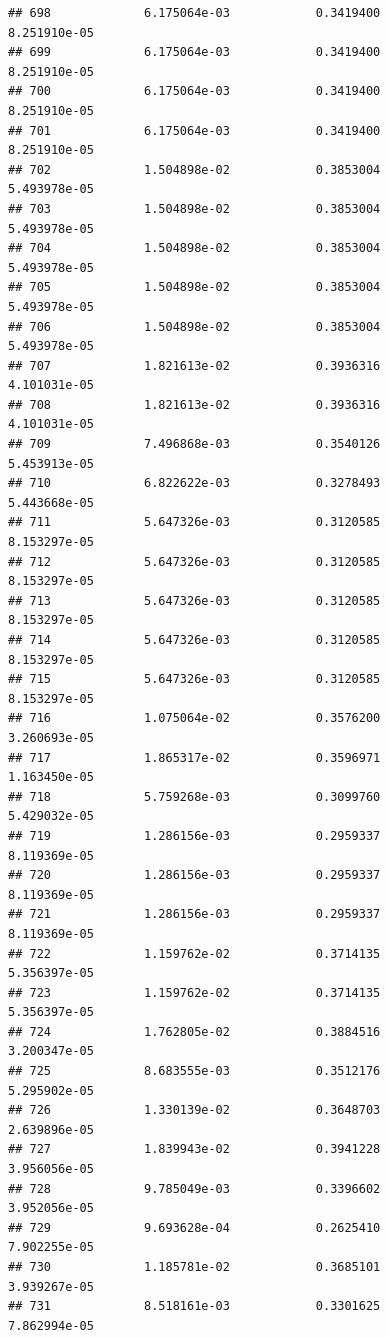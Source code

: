 \documentclass[
]{article}
\begin{document}
\begin{verbatim}
## 698             6.175064e-03            0.3419400            8.251910e-05
## 699             6.175064e-03            0.3419400            8.251910e-05
## 700             6.175064e-03            0.3419400            8.251910e-05
## 701             6.175064e-03            0.3419400            8.251910e-05
## 702             1.504898e-02            0.3853004            5.493978e-05
## 703             1.504898e-02            0.3853004            5.493978e-05
## 704             1.504898e-02            0.3853004            5.493978e-05
## 705             1.504898e-02            0.3853004            5.493978e-05
## 706             1.504898e-02            0.3853004            5.493978e-05
## 707             1.821613e-02            0.3936316            4.101031e-05
## 708             1.821613e-02            0.3936316            4.101031e-05
## 709             7.496868e-03            0.3540126            5.453913e-05
## 710             6.822622e-03            0.3278493            5.443668e-05
## 711             5.647326e-03            0.3120585            8.153297e-05
## 712             5.647326e-03            0.3120585            8.153297e-05
## 713             5.647326e-03            0.3120585            8.153297e-05
## 714             5.647326e-03            0.3120585            8.153297e-05
## 715             5.647326e-03            0.3120585            8.153297e-05
## 716             1.075064e-02            0.3576200            3.260693e-05
## 717             1.865317e-02            0.3596971            1.163450e-05
## 718             5.759268e-03            0.3099760            5.429032e-05
## 719             1.286156e-03            0.2959337            8.119369e-05
## 720             1.286156e-03            0.2959337            8.119369e-05
## 721             1.286156e-03            0.2959337            8.119369e-05
## 722             1.159762e-02            0.3714135            5.356397e-05
## 723             1.159762e-02            0.3714135            5.356397e-05
## 724             1.762805e-02            0.3884516            3.200347e-05
## 725             8.683555e-03            0.3512176            5.295902e-05
## 726             1.330139e-02            0.3648703            2.639896e-05
## 727             1.839943e-02            0.3941228            3.956056e-05
## 728             9.785049e-03            0.3396602            3.952056e-05
## 729             9.693628e-04            0.2625410            7.902255e-05
## 730             1.185781e-02            0.3685101            3.939267e-05
## 731             8.518161e-03            0.3301625            7.862994e-05

\end{verbatim}
\end{document}
